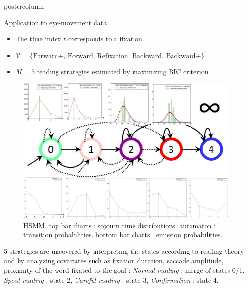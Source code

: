 \documentclass[final,hyperref={pdfpagelabels=false}]{beamer}
\begin{document}
\begin{frame}
\begin{columns}
\begin{column}{.50\textwidth}
\begin{beamercolorbox}[center,wd=\textwidth]{postercolumn}
\begin{minipage}[T]{.98\textwidth}
{            \vfill
            \begin{block}{Application to eye-movement data}
                \begin{itemize}
                    \item[\bullet] The time index $t$ corresponds to a fixation.
                    \item[\bullet] $\mathcal{V} = \{\text{Forward+, Forward, Refixation, Backward, Backward+}\}$
                    \item[\bullet] $M = 5$ reading strategies estimated by maximizing BIC criterion
                \end{itemize}
                \begin{figure}[h]
                    \centering
                    \includegraphics[width=35cm]{hsmm.jpg}
                    \caption{HSMM. top bar charts : sojourn time distributions.
                    automaton : transition probabilities.
                    bottom bar charts : emission probabilities.}
                \end{figure}
                5 strategies are uncovered by interpreting the states according to reading theory and by
                analyzing covariates such as fixation duration, saccade amplitude, proximity of the word fixated to the goal :
                \textit{Normal reading} : merge of states 0/1, \textit{Speed reading} : state 2,
                \textit{Careful reading} : state 3, \textit{Confirmation} : state 4.
                \vskip0.5cm
                \begin{minipage}{0.47\textwidth}
                    \begin{figure}[h]
                        \centering

\end{figure}
\end{minipage}
\end{block}}
\end{minipage}
\end{beamercolorbox}
\end{column}
\end{columns}
\end{frame}
\end{document}
